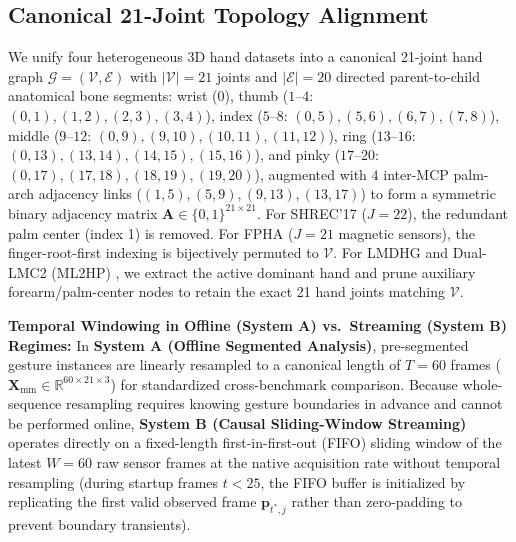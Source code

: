 \documentclass[10pt,twocolumn]{article}
\begin{document}
\subsection{Canonical 21-Joint Topology Alignment}
We unify four heterogeneous 3D hand datasets into a canonical 21-joint hand graph $\mathcal{G} = (\mathcal{V}, \mathcal{E})$ with $|\mathcal{V}|=21$ joints and $|\mathcal{E}|=20$ directed parent-to-child anatomical bone segments: wrist ($0$), thumb ($1\text{--}4$: $(0,1),(1,2),(2,3),(3,4)$), index ($5\text{--}8$: $(0,5),(5,6),(6,7),(7,8)$), middle ($9\text{--}12$: $(0,9),(9,10),(10,11),(11,12)$), ring ($13\text{--}16$: $(0,13),(13,14),(14,15),(15,16)$), and pinky ($17\text{--}20$: $(0,17),(17,18),(18,19),(19,20)$), augmented with $4$ inter-MCP palm-arch adjacency links ($(1,5),(5,9),(9,13),(13,17)$) to form a symmetric binary adjacency matrix $\mathbf{A} \in \{0,1\}^{21\times 21}$. For SHREC'17 \cite{desmedt2017shrec} ($J=22$), the redundant palm center (index 1) is removed. For FPHA \cite{garcia2018first} ($J=21$ magnetic sensors), the finger-root-first indexing is bijectively permuted to $\mathcal{V}$. For LMDHG \cite{boulahia2017dynamic} and Dual-LMC2 (ML2HP) \cite{gilmartin2024dual}, we extract the active dominant hand and prune auxiliary forearm/palm-center nodes to retain the exact 21 hand joints matching $\mathcal{V}$.

\textbf{Temporal Windowing in Offline (System A) vs.\ Streaming (System B) Regimes:} In \textbf{System A (Offline Segmented Analysis)}, pre-segmented gesture instances are linearly resampled to a canonical length of $T=60$ frames ($\mathbf{X}_{\text{mm}} \in \mathbb{R}^{60 \times 21 \times 3}$) for standardized cross-benchmark comparison. Because whole-sequence resampling requires knowing gesture boundaries in advance and cannot be performed online, \textbf{System B (Causal Sliding-Window Streaming)} operates directly on a fixed-length first-in-first-out (FIFO) sliding window of the latest $W=60$ raw sensor frames at the native acquisition rate without temporal resampling (during startup frames $t < 25$, the FIFO buffer is initialized by replicating the first valid observed frame $\mathbf{p}_{t^*,j}$ rather than zero-padding to prevent boundary transients).
\end{document}
